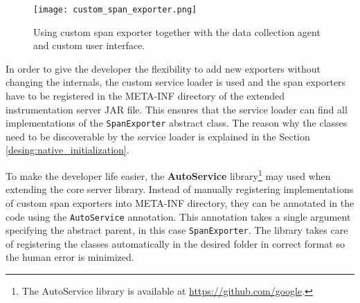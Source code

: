 \begin{figure}
	\centering
	\texttt{[image: custom\_span\_exporter.png]}
	\caption{Using custom span exporter together with the data collection agent and custom user interface.}
	\label{fig:custom_span_exporter}
\end{figure}

In order to give the developer the flexibility to add new exporters without changing the internals, the custom service loader is used and the span exporters have to be registered in the META-INF directory of the extended instrumentation server JAR file. This ensures that the service loader can find all implementations of the \texttt{SpanExporter} abstract class. The reason why the classes need to be discoverable by the service loader is explained in the Section \ref{desing:native_initialization}.

To make the developer life easier, the \textbf{AutoService} library\footnote{The AutoService library is available at \url{https://github.com/google}.} may used when extending the core server library. Instead of manually registering implementations of custom span exporters into META-INF directory, they can be annotated in the code using the \texttt{AutoService} annotation. This annotation takes a single argument specifying the abstract parent, in this case \texttt{SpanExporter}. The library takes care of registering the classes automatically in the desired folder in correct format so the human error is minimized.

